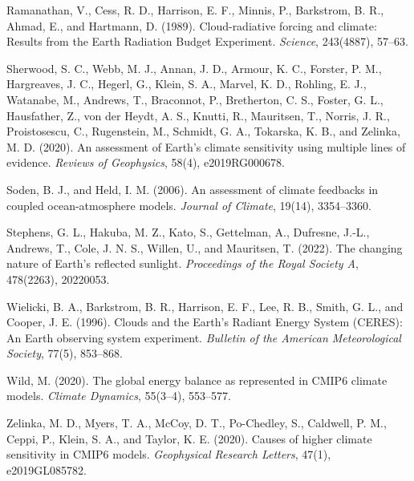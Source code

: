 Ramanathan, V., Cess, R. D., Harrison, E. F., Minnis, P., Barkstrom, B. R., Ahmad, E., and Hartmann, D. (1989). Cloud-radiative forcing and climate: Results from the Earth Radiation Budget Experiment. \textit{Science}, 243(4887), 57--63.

Sherwood, S. C., Webb, M. J., Annan, J. D., Armour, K. C., Forster, P. M., Hargreaves, J. C., Hegerl, G., Klein, S. A., Marvel, K. D., Rohling, E. J., Watanabe, M., Andrews, T., Braconnot, P., Bretherton, C. S., Foster, G. L., Hausfather, Z., von der Heydt, A. S., Knutti, R., Mauritsen, T., Norris, J. R., Proistosescu, C., Rugenstein, M., Schmidt, G. A., Tokarska, K. B., and Zelinka, M. D. (2020). An assessment of Earth's climate sensitivity using multiple lines of evidence. \textit{Reviews of Geophysics}, 58(4), e2019RG000678.

Soden, B. J., and Held, I. M. (2006). An assessment of climate feedbacks in coupled ocean-atmosphere models. \textit{Journal of Climate}, 19(14), 3354--3360.

Stephens, G. L., Hakuba, M. Z., Kato, S., Gettelman, A., Dufresne, J.-L., Andrews, T., Cole, J. N. S., Willen, U., and Mauritsen, T. (2022). The changing nature of Earth's reflected sunlight. \textit{Proceedings of the Royal Society A}, 478(2263), 20220053.

Wielicki, B. A., Barkstrom, B. R., Harrison, E. F., Lee, R. B., Smith, G. L., and Cooper, J. E. (1996). Clouds and the Earth's Radiant Energy System (CERES): An Earth observing system experiment. \textit{Bulletin of the American Meteorological Society}, 77(5), 853--868.

Wild, M. (2020). The global energy balance as represented in CMIP6 climate models. \textit{Climate Dynamics}, 55(3--4), 553--577.

Zelinka, M. D., Myers, T. A., McCoy, D. T., Po-Chedley, S., Caldwell, P. M., Ceppi, P., Klein, S. A., and Taylor, K. E. (2020). Causes of higher climate sensitivity in CMIP6 models. \textit{Geophysical Research Letters}, 47(1), e2019GL085782.

